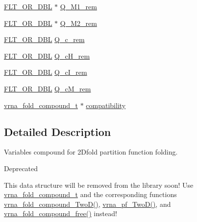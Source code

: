\begin{DoxyCompactItemize}
\item 
\mbox{\hyperlink{group__data__structures_ga31125aeace516926bf7f251f759b6126}{F\+L\+T\+\_\+\+O\+R\+\_\+\+D\+BL}} $\ast$ \mbox{\hyperlink{struct_two_dpfold__vars_ac7c2ae5988f1c89ca2e751b9afd63160}{Q\+\_\+\+M1\+\_\+rem}}
\item 
\mbox{\hyperlink{group__data__structures_ga31125aeace516926bf7f251f759b6126}{F\+L\+T\+\_\+\+O\+R\+\_\+\+D\+BL}} $\ast$ \mbox{\hyperlink{struct_two_dpfold__vars_a3da1a9601f99600f685473b890f19fe8}{Q\+\_\+\+M2\+\_\+rem}}
\item 
\mbox{\hyperlink{group__data__structures_ga31125aeace516926bf7f251f759b6126}{F\+L\+T\+\_\+\+O\+R\+\_\+\+D\+BL}} \mbox{\hyperlink{struct_two_dpfold__vars_a8fbe3e1efedc2830991e98f29b0ac8b3}{Q\+\_\+c\+\_\+rem}}
\item 
\mbox{\hyperlink{group__data__structures_ga31125aeace516926bf7f251f759b6126}{F\+L\+T\+\_\+\+O\+R\+\_\+\+D\+BL}} \mbox{\hyperlink{struct_two_dpfold__vars_a271bc83bf99cfba04619c8a7d07dba47}{Q\+\_\+c\+H\+\_\+rem}}
\item 
\mbox{\hyperlink{group__data__structures_ga31125aeace516926bf7f251f759b6126}{F\+L\+T\+\_\+\+O\+R\+\_\+\+D\+BL}} \mbox{\hyperlink{struct_two_dpfold__vars_a7b9e38c1962e27f0323911c99d0f77e7}{Q\+\_\+c\+I\+\_\+rem}}
\item 
\mbox{\hyperlink{group__data__structures_ga31125aeace516926bf7f251f759b6126}{F\+L\+T\+\_\+\+O\+R\+\_\+\+D\+BL}} \mbox{\hyperlink{struct_two_dpfold__vars_a81439a6e4648f9044f7a11b82756cac7}{Q\+\_\+c\+M\+\_\+rem}}
\item 
\mbox{\hyperlink{group__fold__compound_ga1b0cef17fd40466cef5968eaeeff6166}{vrna\+\_\+fold\+\_\+compound\+\_\+t}} $\ast$ \mbox{\hyperlink{struct_two_dpfold__vars_a159ec125caf5c33f5c19dbeeed54c047}{compatibility}}
\end{DoxyCompactItemize}


\subsection{Detailed Description}
Variables compound for 2\+Dfold partition function folding. 

\begin{DoxyRefDesc}{Deprecated}
\item[\mbox{\hyperlink{deprecated__deprecated000006}{Deprecated}}]This data structure will be removed from the library soon! Use \mbox{\hyperlink{group__fold__compound_ga1b0cef17fd40466cef5968eaeeff6166}{vrna\+\_\+fold\+\_\+compound\+\_\+t}} and the corresponding functions \mbox{\hyperlink{group__fold__compound_ga9d24b196753b4f9f03774f11661510f5}{vrna\+\_\+fold\+\_\+compound\+\_\+\+Two\+D()}}, \mbox{\hyperlink{group__kl__neighborhood__pf_ga0bc3427689bd09da09b8b3094a27f836}{vrna\+\_\+pf\+\_\+\+Two\+D()}}, and \mbox{\hyperlink{group__fold__compound_gadded6039d63f5d6509836e20321534ad}{vrna\+\_\+fold\+\_\+compound\+\_\+free()}} instead! \end{DoxyRefDesc}



